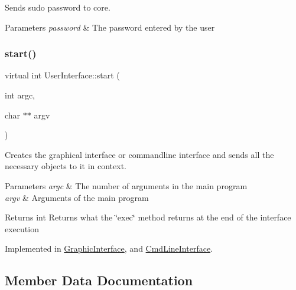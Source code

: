 Sends sudo password to core. 


\begin{DoxyParams}{Parameters}
{\em password} & The password entered by the user \\
\hline
\end{DoxyParams}
\mbox{\label{class_user_interface_a4f637eb516dc7dc59cbfba43b85a81ff}} 
\subsubsection{\texorpdfstring{start()}{start()}}
{\footnotesize\ttfamily virtual int User\+Interface\+::start (\begin{DoxyParamCaption}\item[{int}]{argc,  }\item[{char $\ast$$\ast$}]{argv }\end{DoxyParamCaption})\hspace{0.3cm}{\ttfamily [pure virtual]}}



Creates the graphical interface or commandline interface and sends all the necessary objects to it in context. 


\begin{DoxyParams}{Parameters}
{\em argc} & The number of arguments in the main program \\
\hline
{\em argv} & Arguments of the main program \\
\hline
\end{DoxyParams}
\begin{DoxyReturn}{Returns}
int Returns what the \char`\"{}exec\char`\"{} method returns at the end of the interface execution 
\end{DoxyReturn}


Implemented in \hyperlink{class_graphic_interface_a41d17554d5ec2b24601f34304ce1c3cf}{Graphic\+Interface}, and \hyperlink{class_cmd_line_interface_af3b0b06d68e78c862e352b7f450c891e}{Cmd\+Line\+Interface}.



\subsection{Member Data Documentation}
\mbox{\label{class_user_interface_ae48820f0f4d47821a1c7ed9e070a26a7}} 
